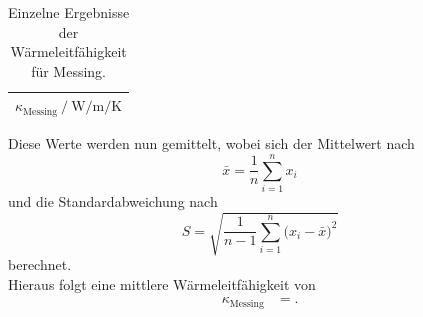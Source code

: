 \begin{table}
  \centering
  \caption{Einzelne Ergebnisse der Wärmeleitfähigkeit für Messing.}
  \label{tab:4}
  \begin{tabular}{c}
    \toprule
    {$\kappa_\text{Messing} \:/\: \si{\watt\per\metre\per\kelvin}$}\\
    \midrule
    
    \bottomrule
  \end{tabular}
\end{table}

Diese Werte werden nun gemittelt, wobei sich der Mittelwert nach
\begin{equation}
  \bar{x} = \frac{1}{n} \sum_{i=1}^n x_i
\end{equation}
und die Standardabweichung nach
\begin{equation}
  S = \sqrt{ \frac{1}{n-1} \sum_{i=1}^n  \bigl(x_i - \bar{x} \bigr)^2  }
\end{equation}
berechnet.\\
Hieraus folgt eine mittlere Wärmeleitfähigkeit von
\begin{align*}
  \kappa_\text{Messing} &= . \\
\end{align*}
